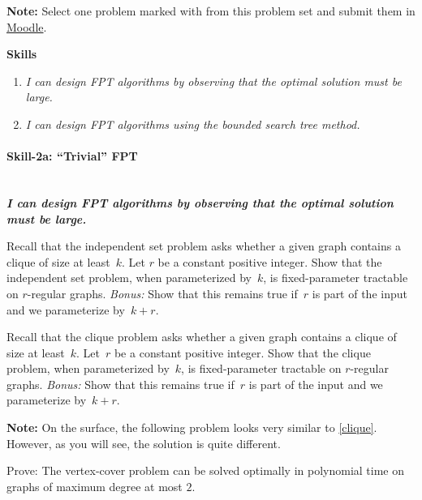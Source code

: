 \documentclass{uebung_cs}
\begin{document}
\textbf{Note:} Select one problem marked with \mandatory{} from this problem set and submit them in \href{https://moodle.studiumdigitale.uni-frankfurt.de/moodle/course/view.php?id=6259}{Moodle}.

\textbf{Skills}
\begin{enumerate}[S\theblattnummer{}a]
  \item\label{skill:trivial}
  \itshape I can design FPT algorithms by observing that the optimal solution must be large.
  \item\label{skill:bst}
    \itshape I can design FPT algorithms using the bounded search tree method.
\end{enumerate}

\sepline
\paragraph*{Skill-2a: \enquote{Trivial} FPT}\mbox{}\\
\textbf{\itshape I can design FPT algorithms by observing that the optimal solution must be large.}

\begin{exercise}[Independent set in regular graphs] %
  Recall that the independent set problem asks whether a given graph contains a clique of size at least~$k$.
  Let $r$ be a constant positive integer.
  Show that the independent set problem, when parameterized by~$k$, is fixed-parameter tractable on $r$-regular graphs.
  \emph{Bonus:} Show that this remains true if~$r$ is part of the input and we parameterize by~$k+r$.
\end{exercise}

  \begin{exercise}\label{clique}
    Recall that the clique problem asks whether a given graph contains a clique of size at least~$k$.
    Let~$r$ be a constant positive integer.
    Show that the clique problem, when parameterized by~$k$, is fixed-parameter tractable on $r$-regular graphs.
    \emph{Bonus:} Show that this remains true if~$r$ is part of the input and we parameterize by~$k+r$.
  \end{exercise}
  
  \textbf{Note:} On the surface, the following problem looks very similar to \ref{clique}. However, as you will see, the solution is quite different.

  \begin{exercise}
  Prove: The vertex-cover problem can be solved optimally in polynomial time on graphs of maximum degree at most $2$.
  \end{exercise}
  
\end{document}
